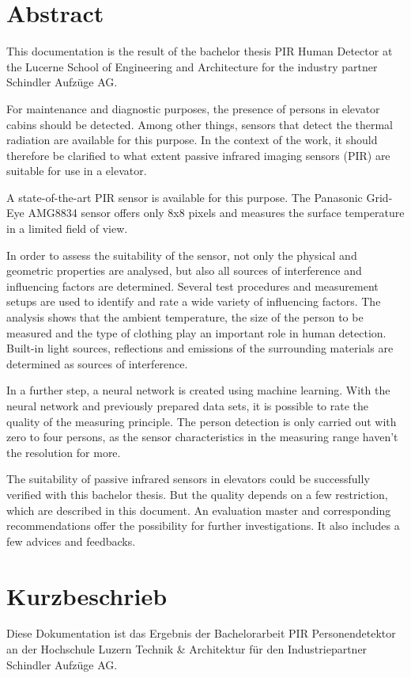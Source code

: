 \chapter*{Abstract}
\label{chap:abstract_englisch}
This documentation is the result of the bachelor thesis PIR Human Detector at the Lucerne School of Engineering and Architecture for the industry partner Schindler Aufzüge AG.

For maintenance and diagnostic purposes, the presence of persons in elevator cabins should be detected. Among other things, sensors that detect the thermal radiation are available for this purpose. In the context of the work, it should therefore be clarified to what extent passive infrared imaging sensors (PIR) are suitable for use in a elevator. 

A state-of-the-art PIR sensor is available for this purpose. The Panasonic Grid-Eye AMG8834 sensor offers only 8x8 pixels and measures the surface temperature in a limited field of view.  

In order to assess the suitability of the sensor, not only the physical and geometric properties are analysed, but also all sources of interference and influencing factors are determined. Several test procedures and measurement setups are used to identify and rate a wide variety of influencing factors. The analysis shows that the ambient temperature, the size of the person to be measured and the type of clothing play an important role in human detection. Built-in light sources, reflections and emissions of the surrounding materials are determined as sources of interference.  

In a further step, a neural network is created using machine learning. With the neural network and previously prepared data sets, it is possible to rate the quality of the measuring principle. The person detection is only carried out with zero to four persons, as the sensor characteristics in the measuring range haven't the resolution for more. 

The suitability of passive infrared sensors in elevators could be successfully verified with this bachelor thesis. But the quality depends on a few restriction, which are described in this document. An evaluation master and corresponding recommendations offer the possibility for further investigations. It also includes a few advices and feedbacks. 


\chapter*{Kurzbeschrieb}
\label{chap:abstract_german}
Diese Dokumentation ist das Ergebnis der Bachelorarbeit PIR Personendetektor an der Hochschule Luzern Technik \& Architektur für den Industriepartner Schindler Aufzüge AG. 

